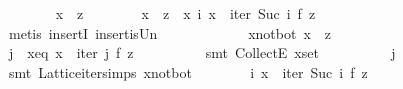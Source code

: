 \begin{isabellebody}
\ \ \ \ \ \ \isamarkupfalse%
\ {}x\ {}\ z{}\isanewline
\ \ \ \ \ \ \isamarkupfalse%
\ {}x\ {}\ {}z{}\ {}\ {}x{}\ {}i{}\ x\ {}\ iter\ {}Suc\ i{}\ f\ z{}{}\isanewline
\ \ \ \ \ \ \ \ \isamarkupfalse%
\ {}metis\ insertI{}\ insert{}is{}Un{}\isanewline
\ \ \ \ \isamarkupfalse%
\isanewline
\ \ \ \ \ \ \isamarkupfalse%
\ x{}not{}bot{}\ {}x\ {}\ z{}\isanewline
\ \ \ \ \ \ \isamarkupfalse%
\ j\ \ x{}eq{}\ {}x\ {}\ iter\ j\ f\ z{}\isanewline
\ \ \ \ \ \ \ \ \isamarkupfalse%
\ {}smt\ CollectE\ x{}set{}\isanewline
\ \ \ \ \ \ \isamarkupfalse%
\ {}{}\ {}\ j{}\isanewline
\ \ \ \ \ \ \ \ \isamarkupfalse%
\ {}smt\ Lattice{}iter{}simps{}{}{}\ x{}not{}bot{}\isanewline
\ \ \ \ \ \ \isamarkupfalse%
\ {}{}i{}\ x\ {}\ iter\ {}Suc\ i{}\ f\ z{}\isanewline

\end{isabellebody}
